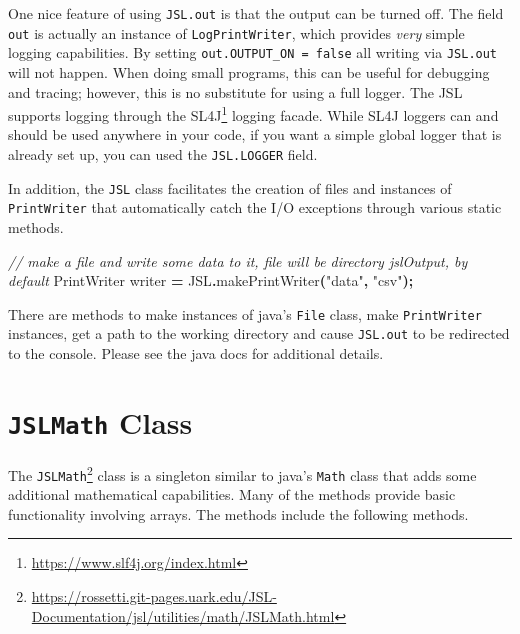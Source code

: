 \documentclass[
]{book}
\newenvironment{Shaded}{\begin{snugshade}}{\end{snugshade}}
\newcommand{\BuiltInTok}[1]{#1}
\newcommand{\CommentTok}[1]{\textcolor[rgb]{0.56,0.35,0.01}{\textit{#1}}}
\newcommand{\FunctionTok}[1]{\textcolor[rgb]{0.00,0.00,0.00}{#1}}
\newcommand{\NormalTok}[1]{#1}
\newcommand{\OperatorTok}[1]{\textcolor[rgb]{0.81,0.36,0.00}{\textbf{#1}}}
\newcommand{\StringTok}[1]{\textcolor[rgb]{0.31,0.60,0.02}{#1}}
\renewcommand{\href}[2]{#2\footnote{\url{#1}}}
\theoremstyle{definition}
\theoremstyle{definition}
\theoremstyle{definition}
\theoremstyle{definition}
\theoremstyle{remark}
\begin{document}
One nice feature of using \texttt{JSL.out} is that the output can be turned off. The field \texttt{out} is actually an instance of \texttt{LogPrintWriter}, which provides \emph{very} simple logging capabilities. By setting \texttt{out.OUTPUT\_ON\ =\ false} all writing via \texttt{JSL.out} will not happen. When doing small programs, this can be useful for debugging and tracing; however, this is no substitute for using a full logger. The JSL supports logging through the \href{https://www.slf4j.org/index.html}{SL4J} logging facade. While SL4J loggers can and should be used anywhere in your code, if you want a simple global logger that is already set up, you can used the \texttt{JSL.LOGGER} field.

In addition, the \texttt{JSL} class facilitates the creation of files and instances of \texttt{PrintWriter} that automatically catch the I/O exceptions through various static methods.

\begin{Shaded}
\begin{Highlighting}[]
\CommentTok{// make a file and write some data to it, file will be directory jslOutput, by default}
\BuiltInTok{PrintWriter}\NormalTok{ writer }\OperatorTok{=}\NormalTok{ JSL}\OperatorTok{.}\FunctionTok{makePrintWriter}\OperatorTok{(}\StringTok{"data"}\OperatorTok{,} \StringTok{"csv"}\OperatorTok{);}
\end{Highlighting}
\end{Shaded}

There are methods to make instances of java's \texttt{File} class, make \texttt{PrintWriter} instances, get a path to the working directory and cause \texttt{JSL.out} to be redirected to the console. Please see the java docs for additional details.

\hypertarget{jslmath-class}{%
\section{\texorpdfstring{\texttt{JSLMath} Class}{JSLMath Class}}\label{jslmath-class}}

The \href{https://rossetti.git-pages.uark.edu/JSL-Documentation/jsl/utilities/math/JSLMath.html}{\texttt{JSLMath}} class is a singleton similar to java's \texttt{Math} class that adds some additional mathematical capabilities. Many of the methods provide basic functionality involving arrays. The methods include the following methods.
\end{document}
